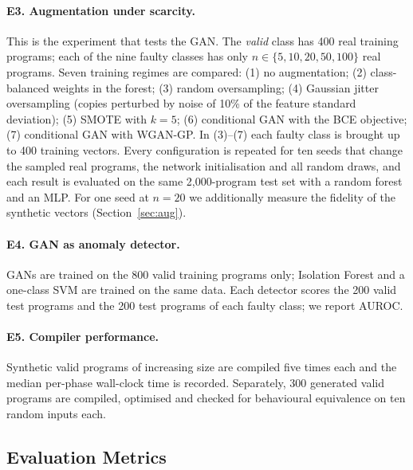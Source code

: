 \documentclass[conference]{IEEEtran}
\begin{document}
\paragraph{E3. Augmentation under scarcity.} This is the experiment that tests the GAN. The \emph{valid} class has
400 real training programs; each of the nine faulty classes has only $n\in\{5,10,20,50,100\}$ real programs. Seven
training regimes are compared: (1) no augmentation; (2) class-balanced weights in the forest; (3) random oversampling;
(4) Gaussian jitter oversampling (copies perturbed by noise of 10\% of the feature standard deviation); (5) SMOTE
\cite{chawla2002} with $k=5$; (6) conditional GAN with the BCE objective; (7) conditional GAN with WGAN-GP. In (3)--(7)
each faulty class is brought up to 400 training vectors. Every configuration is repeated for ten seeds that change
the sampled real programs, the network initialisation and all random draws, and each result is evaluated on the same
2{,}000-program test set with a random forest and an MLP. For one seed at $n=20$ we additionally measure the fidelity of
the synthetic vectors (Section~\ref{sec:aug}).

\paragraph{E4. GAN as anomaly detector.} GANs are trained on the 800 valid training programs only; Isolation Forest and a
one-class SVM are trained on the same data. Each detector scores the 200 valid test programs and the 200 test programs
of each faulty class; we report AUROC.

\paragraph{E5. Compiler performance.} Synthetic valid programs of increasing size are compiled five times each and the
median per-phase wall-clock time is recorded. Separately, 300 generated valid programs are compiled, optimised and
checked for behavioural equivalence on ten random inputs each.

\subsection{Evaluation Metrics}
\end{document}
